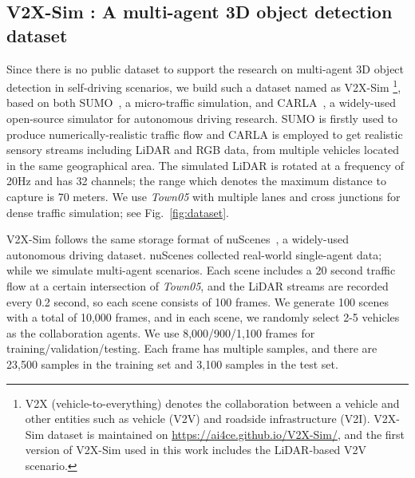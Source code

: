 \documentclass{article}
\begin{document}
\subsection{V2X-Sim : A multi-agent 3D object detection dataset}\label{subsec:dataset}
Since there is no public dataset to support the research on multi-agent 3D object detection in self-driving scenarios, we build such a dataset named as V2X-Sim \footnote[2]{V2X (vehicle-to-everything) denotes the collaboration between a vehicle and other entities such as vehicle (V2V) and roadside infrastructure (V2I). V2X-Sim dataset is maintained on \url{https://ai4ce.github.io/V2X-Sim/}, and the first version of V2X-Sim used in this work includes the LiDAR-based V2V scenario.}, based on both SUMO~\cite{krajzewicz2012recent}, a micro-traffic simulation, and CARLA~\cite{Dosovitskiy17}, a widely-used open-source simulator for autonomous driving research. SUMO is firstly used to produce numerically-realistic traffic flow and CARLA is employed to get realistic sensory streams including LiDAR and RGB data, from multiple vehicles located in the same geographical area. The simulated LiDAR is rotated at a frequency of 20Hz and has 32 channels; the range which denotes the maximum distance to capture is 70 meters. We use \textit{Town05} with multiple lanes and cross junctions for dense traffic simulation; see Fig.~\ref{fig:dataset}. 

V2X-Sim  follows the same storage format of nuScenes~\cite{caesar2020nuscenes}, a widely-used autonomous driving dataset. nuScenes collected real-world single-agent data; while we simulate multi-agent scenarios. Each scene includes a 20 second traffic flow at a certain intersection of \textit{Town05}, and the LiDAR streams are recorded every 0.2 second, so each scene consists of 100 frames. We generate 100 scenes with a total of 10,000 frames, and in each scene, we randomly select 2-5 vehicles as the collaboration agents. We use 8,000/900/1,100 frames for training/validation/testing. Each frame has multiple samples, and there are 23,500 samples in the training set and 3,100 samples in the test set.
\end{document}
